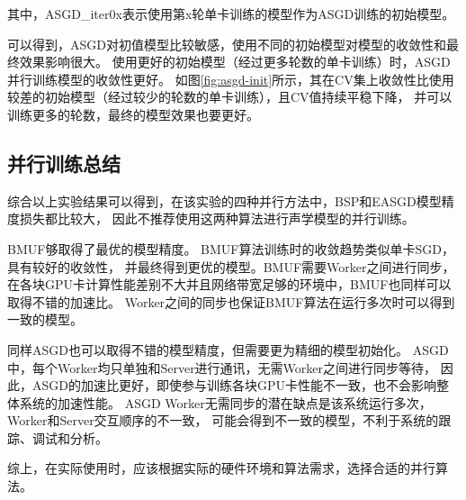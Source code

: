 其中，ASGD\_iter0x表示使用第x轮单卡训练的模型作为ASGD训练的初始模型。

可以得到，ASGD对初值模型比较敏感，使用不同的初始模型对模型的收敛性和最终效果影响很大。
使用更好的初始模型（经过更多轮数的单卡训练）时，ASGD并行训练模型的收敛性更好。
如图\ref{fig:asgd-init}所示，其在CV集上收敛性比使用较差的初始模型（经过较少的轮数的单卡训练），且CV值持续平稳下降，
并可以训练更多的轮数，最终的模型效果也要更好。

\subsection{并行训练总结}

综合以上实验结果可以得到，在该实验的四种并行方法中，BSP和EASGD模型精度损失都比较大，
因此不推荐使用这两种算法进行声学模型的并行训练。

BMUF够取得了最优的模型精度。
BMUF算法训练时的收敛趋势类似单卡SGD，具有较好的收敛性，
并最终得到更优的模型。BMUF需要Worker之间进行同步，
在各块GPU卡计算性能差别不大并且网络带宽足够的环境中，BMUF也同样可以取得不错的加速比。
Worker之间的同步也保证BMUF算法在运行多次时可以得到一致的模型。

同样ASGD也可以取得不错的模型精度，但需要更为精细的模型初始化。
ASGD中，每个Worker均只单独和Server进行通讯，无需Worker之间进行同步等待，
因此，ASGD的加速比更好，即使参与训练各块GPU卡性能不一致，也不会影响整体系统的加速性能。
ASGD Worker无需同步的潜在缺点是该系统运行多次，Worker和Server交互顺序的不一致，
可能会得到不一致的模型，不利于系统的跟踪、调试和分析。

综上，在实际使用时，应该根据实际的硬件环境和算法需求，选择合适的并行算法。

